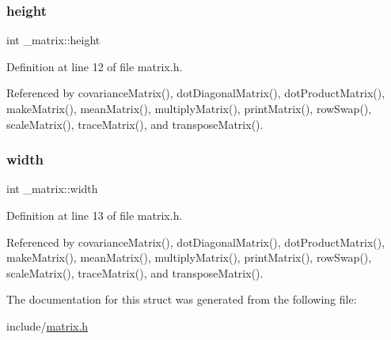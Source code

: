 \mbox{\label{struct__matrix_a8d3b2dbcf98704f11073d646273eb3b0}} 
\subsubsection{\texorpdfstring{height}{height}}
{\footnotesize\ttfamily int \+\_\+matrix\+::height}



Definition at line 12 of file matrix.\+h.



Referenced by covariance\+Matrix(), dot\+Diagonal\+Matrix(), dot\+Product\+Matrix(), make\+Matrix(), mean\+Matrix(), multiply\+Matrix(), print\+Matrix(), row\+Swap(), scale\+Matrix(), trace\+Matrix(), and transpose\+Matrix().

\mbox{\label{struct__matrix_a30d055d00e1b4afea4568f2aa1cf5c37}} 
\subsubsection{\texorpdfstring{width}{width}}
{\footnotesize\ttfamily int \+\_\+matrix\+::width}



Definition at line 13 of file matrix.\+h.



Referenced by covariance\+Matrix(), dot\+Diagonal\+Matrix(), dot\+Product\+Matrix(), make\+Matrix(), mean\+Matrix(), multiply\+Matrix(), print\+Matrix(), row\+Swap(), scale\+Matrix(), trace\+Matrix(), and transpose\+Matrix().



The documentation for this struct was generated from the following file\+:\begin{DoxyCompactItemize}
\item 
include/\hyperlink{matrix_8h}{matrix.\+h}\end{DoxyCompactItemize}
